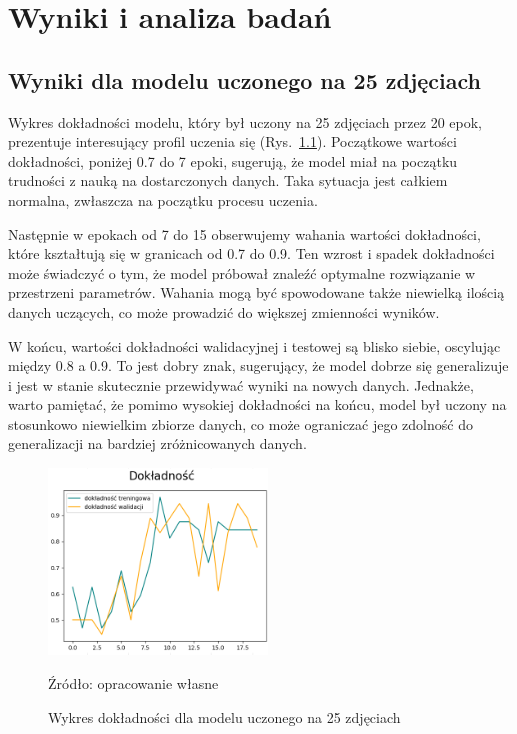 \chapter{Wyniki i analiza badań}

\section{Wyniki dla modelu uczonego na 25 zdjęciach}

Wykres dokładności modelu, który był uczony na 25 zdjęciach przez 20 epok, prezentuje interesujący profil uczenia się (Rys.~\ref{fig:wykres_dokladnosc_25}). Początkowe wartości dokładności, poniżej 0.7 do 7 epoki, sugerują, że model miał na początku trudności z nauką na dostarczonych danych. Taka sytuacja jest całkiem normalna, zwłaszcza na początku procesu uczenia.

Następnie w epokach od 7 do 15 obserwujemy wahania wartości dokładności, które kształtują się w granicach od 0.7 do 0.9. Ten wzrost i spadek dokładności może świadczyć o tym, że model próbował znaleźć optymalne rozwiązanie w przestrzeni parametrów. Wahania mogą być spowodowane także niewielką ilością danych uczących, co może prowadzić do większej zmienności wyników.

W końcu, wartości dokładności walidacyjnej i testowej są blisko siebie, oscylując między 0.8 a 0.9. To jest dobry znak, sugerujący, że model dobrze się generalizuje i jest w stanie skutecznie przewidywać wyniki na nowych danych. Jednakże, warto pamiętać, że pomimo wysokiej dokładności na końcu, model był uczony na stosunkowo niewielkim zbiorze danych, co może ograniczać jego zdolność do generalizacji na bardziej zróżnicowanych danych.

\begin{figure}[htbp]
  \centering
  \caption{Wykres dokładności dla modelu uczonego na 25 zdjęciach}
  \includegraphics[width=220px]{images/dokladnosc_25.png}
  \begin{center}
  \footnotesize{Źródło: opracowanie własne}
  \end{center}
  \label{fig:wykres_dokladnosc_25}
\end{figure}

